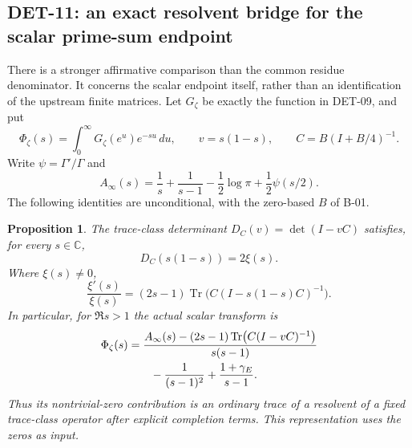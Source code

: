 \documentclass[11pt,a4paper]{article}
\newcommand{\Tr}{\operatorname{Tr}}
\newcommand{\C}{\mathbb C}
\newcommand{\fid}[1]{\textsf{#1}}
\newtheorem*{proposition}{Proposition}
\begin{document}
\subsection{DET-11: an exact resolvent bridge for the scalar prime-sum endpoint}
There is a stronger affirmative comparison than the common residue denominator. It concerns the scalar endpoint itself, rather than an identification of the upstream finite matrices. Let $G_\zeta$ be exactly the function in \fid{DET-09}, and put
\[
 \Phi_\zeta(s)=\int_0^\infty G_\zeta(e^u)e^{-su}\,du,
 \qquad v=s(1-s),\qquad C=B(I+B/4)^{-1}.
\]
Write $\psi=\Gamma'/\Gamma$ and
\[
 A_\infty(s)=\frac1s+\frac1{s-1}-\frac12\log\pi+
 \frac12\psi(s/2).
\]
The following identities are unconditional, with the zero-based $B$ of \fid{B-01}.
\begin{proposition}
The trace-class determinant $D_C(v)=\det(I-vC)$ satisfies, for every $s\in\C$,
\begin{equation}\label{eq:Cdetcompletion}
 D_C(s(1-s))=2\xi(s).
\end{equation}
Where $\xi(s)\ne0$,
\begin{equation}\label{eq:Cresolvent}
 \frac{\xi'(s)}{\xi(s)}=(2s-1)\Tr\bigl(C(I-s(1-s)C)^{-1}\bigr).
\end{equation}
In particular, for $\Re s>1$ the actual scalar transform is
\begin{align}\label{eq:Phiresolvent}
 \Phi_\zeta(s)
 &=\frac{A_\infty(s)-(2s-1)\Tr\bigl(C(I-vC)^{-1}\bigr)}{s(s-1)}\notag\\
 &\hspace{7mm}-\frac1{(s-1)^2}+\frac{1+\gamma_E}{s-1}.
\end{align}
Thus its nontrivial-zero contribution is an ordinary trace of a resolvent of a fixed trace-class operator after explicit completion terms. This representation uses the zeros as input.
\end{proposition}
\end{document}
